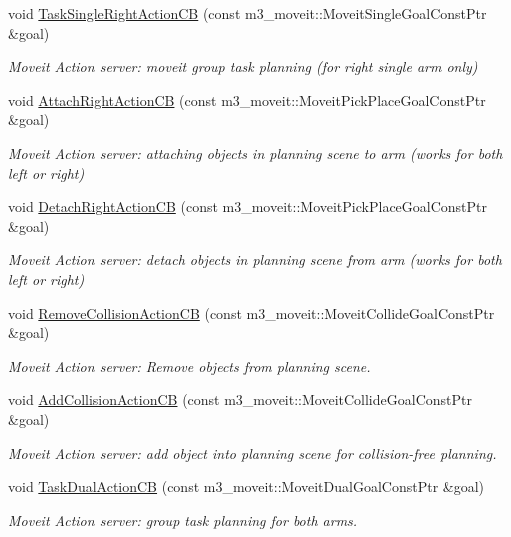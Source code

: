 \begin{DoxyCompactItemize}
void \hyperlink{classM3MoveGroup_aee17065b5aa40384dcca5a6589261ded}{Task\+Single\+Right\+Action\+CB} (const m3\+\_\+moveit\+::\+Moveit\+Single\+Goal\+Const\+Ptr \&goal)
\begin{DoxyCompactList}\small\item\em Moveit Action server\+: moveit group task planning (for right single arm only) \end{DoxyCompactList}\item 
void \hyperlink{classM3MoveGroup_abbc7367f21a594bd3ae7a91fe6441480}{Attach\+Right\+Action\+CB} (const m3\+\_\+moveit\+::\+Moveit\+Pick\+Place\+Goal\+Const\+Ptr \&goal)
\begin{DoxyCompactList}\small\item\em Moveit Action server\+: attaching objects in planning scene to arm (works for both left or right) \end{DoxyCompactList}\item 
void \hyperlink{classM3MoveGroup_a0e43c201d45fd9d987dd5b57f57e6402}{Detach\+Right\+Action\+CB} (const m3\+\_\+moveit\+::\+Moveit\+Pick\+Place\+Goal\+Const\+Ptr \&goal)
\begin{DoxyCompactList}\small\item\em Moveit Action server\+: detach objects in planning scene from arm (works for both left or right) \end{DoxyCompactList}\item 
void \hyperlink{classM3MoveGroup_afad468e11f51e093ef704ebe974ecc28}{Remove\+Collision\+Action\+CB} (const m3\+\_\+moveit\+::\+Moveit\+Collide\+Goal\+Const\+Ptr \&goal)
\begin{DoxyCompactList}\small\item\em Moveit Action server\+: Remove objects from planning scene. \end{DoxyCompactList}\item 
void \hyperlink{classM3MoveGroup_aa1aa80c1a53d3829ed0e535f728cbe63}{Add\+Collision\+Action\+CB} (const m3\+\_\+moveit\+::\+Moveit\+Collide\+Goal\+Const\+Ptr \&goal)
\begin{DoxyCompactList}\small\item\em Moveit Action server\+: add object into planning scene for collision-\/free planning. \end{DoxyCompactList}\item 
void \hyperlink{classM3MoveGroup_a4999726d3def40e06217e81fb7f095ab}{Task\+Dual\+Action\+CB} (const m3\+\_\+moveit\+::\+Moveit\+Dual\+Goal\+Const\+Ptr \&goal)
\begin{DoxyCompactList}\small\item\em Moveit Action server\+: group task planning for both arms. \end{DoxyCompactList}\item 

\end{DoxyCompactItemize}

